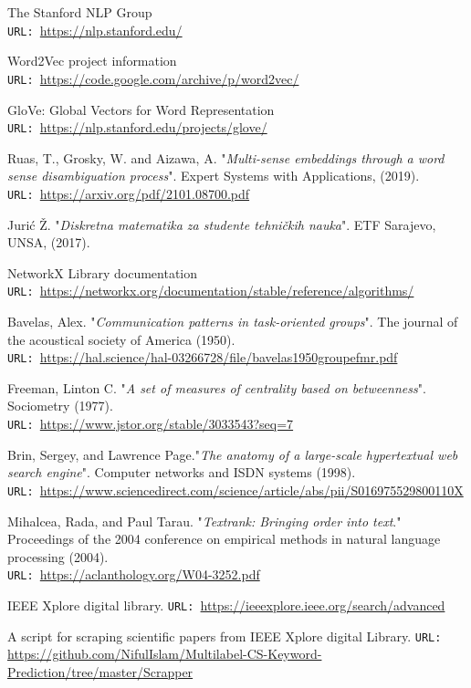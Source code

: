 \documentclass[12pt]{article}
\numberwithin{equation}{section}
\begin{document}
\begin{spacing}{1.5}
\begin{thebibliography}{8}
		The Stanford NLP Group\\
		\texttt{URL: }\url{https://nlp.stanford.edu/}
		
		Word2Vec project information\\
		\texttt{URL: }\url{https://code.google.com/archive/p/word2vec/}
		
		GloVe: Global Vectors for Word Representation\\
		\texttt{URL: }\url{https://nlp.stanford.edu/projects/glove/}
		
		Ruas, T., Grosky, W. and Aizawa, A.  "\textit{Multi-sense embeddings through a word sense disambiguation process}". Expert Systems with Applications,  (2019). \\
		\texttt{URL: }\url{https://arxiv.org/pdf/2101.08700.pdf}
		
		Jurić Ž. "\textit{Diskretna matematika za studente tehničkih nauka}". ETF Sarajevo, UNSA, (2017). 
		
		NetworkX Library documentation\\
		\texttt{URL: }\url{https://networkx.org/documentation/stable/reference/algorithms/}
		
		Bavelas, Alex. "\textit{Communication patterns in task‐oriented groups}". The journal of the acoustical society of America (1950). \\
		\texttt{URL: }\url{https://hal.science/hal-03266728/file/bavelas1950groupefmr.pdf}
		
		Freeman, Linton C. "\textit{A set of measures of centrality based on betweenness}". Sociometry (1977). \\
		\texttt{URL: }\url{https://www.jstor.org/stable/3033543?seq=7}
		
		Brin, Sergey, and Lawrence Page."\textit{The anatomy of a large-scale hypertextual web search engine}". Computer networks and ISDN systems (1998). \\
		\texttt{URL: }\url{https://www.sciencedirect.com/science/article/abs/pii/S016975529800110X}
		
		Mihalcea, Rada, and Paul Tarau. "\textit{Textrank: Bringing order into text}." Proceedings of the 2004 conference on empirical methods in natural language processing (2004). \\
		\texttt{URL: }\url{https://aclanthology.org/W04-3252.pdf}
		
		IEEE Xplore digital library.
		\texttt{URL: }\url{https://ieeexplore.ieee.org/search/advanced}
		
		A script for scraping scientific papers from IEEE Xplore digital Library.
		\texttt{URL: }\url{https://github.com/NifulIslam/Multilabel-CS-Keyword-Prediction/tree/master/Scrapper}
		
		
		
	\end{thebibliography}

	\end{spacing}
	
\end{document}
